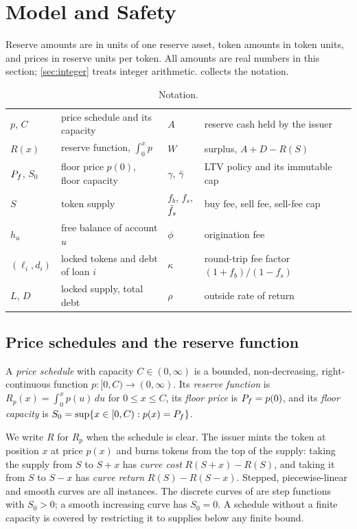 \section{Model and Safety}\label{sec:model}

Reserve amounts are in units of one reserve asset, token amounts in token units, and prices in reserve units per token. All amounts are real numbers in this section; \cref{sec:integer} treats integer arithmetic.  collects the notation.

\begin{table}[t]
\centering\small
\caption{Notation.}\label{tab:notation}
\begin{tabular}{@{}ll@{\qquad}ll@{}}
\toprule
$p$, $C$ & price schedule and its capacity & $A$ & reserve cash held by the issuer\\
$R(x)$ & reserve function, $\int_0^x p$ & $W$ & surplus, $A+D-R(S)$\\
$P_f$, $S_0$ & floor price $p(0)$, floor capacity & $\gamma$, $\bar\gamma$ & LTV policy and its immutable cap\\
$S$ & token supply & $f_b$, $f_s$, $\bar f_s$ & buy fee, sell fee, sell-fee cap\\
$h_u$ & free balance of account $u$ & $\phi$ & origination fee\\
$(\ell_i,d_i)$ & locked tokens and debt of loan $i$ & $\kappa$ & round-trip fee factor $(1+f_b)/(1-f_s)$\\
$L$, $D$ & locked supply, total debt & $\rho$ & outside rate of return\\
\bottomrule
\end{tabular}
\end{table}

\subsection{Price schedules and the reserve function}

\begin{definition}\label{def:schedule}
A \emph{price schedule} with capacity $C\in(0,\infty)$ is a bounded, non-decreasing, right-continuous function $p:[0,C)\to(0,\infty)$. Its \emph{reserve function} is $R_p(x)=\int_0^x p(u)\,du$ for $0\le x\le C$, its \emph{floor price} is $P_f=p(0)$, and its \emph{floor capacity} is $S_0=\sup\{x\in[0,C): p(x)=P_f\}$.
\end{definition}

We write $R$ for $R_p$ when the schedule is clear. The issuer mints the token at position $x$ at price $p(x)$ and burns tokens from the top of the supply: taking the supply from $S$ to $S+x$ has \emph{curve cost} $R(S+x)-R(S)$, and taking it from $S$ to $S-x$ has \emph{curve return} $R(S)-R(S-x)$. Stepped, piecewise-linear and smooth curves are all instances. The discrete curves of \vone{} are step functions with $S_0>0$; a smooth increasing curve has $S_0=0$. A schedule without a finite capacity is covered by restricting it to supplies below any finite bound.

